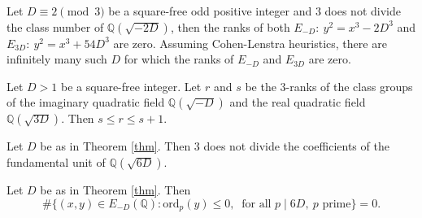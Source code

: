 \documentclass[10pt,a4paper]{amsart}
\begin{document}
\begin{thm}\label{thm}
Let $D\equiv 2\pmod 3$ be a square-free odd positive integer and $3$ does not divide the class number of $\mathbb{Q}(\sqrt{-2D})$, then the ranks of both $E_{-D}:~ y^2=x^3-2D^3$ and $E_{3D}:~ y^2=x^3+54D^3$ are zero. Assuming Cohen-Lenstra heuristics, there are infinitely many such $D$ for which the ranks of $E_{-D}$ and $E_{3D}$ are zero.
\end{thm}   

\begin{thma}\label{thmsc} Let $D>1$ be a square-free integer. Let $r$ and $s$ be the $3$-ranks of the class groups of the imaginary quadratic field $\mathbb{Q}(\sqrt{-D})$ and the real quadratic field $\mathbb{Q}(\sqrt{3D})$. Then $s\leq r\leq s+1$.
\end{thma}

 \begin{prop}\label{propcfu}
 Let $D$ be as in Theorem \ref{thm}. Then $3$ does not divide the coefficients of the fundamental unit of $\mathbb{Q}(\sqrt{6D})$. 
\end{prop}

\begin{prop}\label{prop1}
Let $D$ be as in Theorem \ref{thm}. Then $$\#\{(x,y)\in E_{-D}(\mathbb{Q}): \text{ord}_p(y)\leq 0,~\text{ for all }  p\mid 6D,~ p\text{ prime}\}=0.$$
\end{prop}
\end{document}
